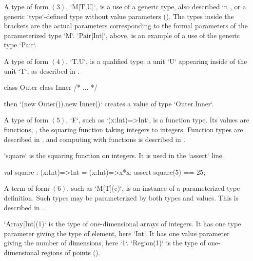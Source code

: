 A type of form {$(3)$}, \xcd`M[T,U]`, is a use of a  generic type, also described in 
, or a generic \xcd`type`-defined type without
value parameters (). 
The types inside the brackets are the actual parameters corresponding to the
formal parameters of the parameterized type \xcd`M`.  
\xcd`Pair[Int]`, above, is an example of a use of the generic type \xcd`Pair`. 

A type of form {$(4)$}, \xcd`T.U`, is a qualified type: a unit \xcd`U` appearing inside of
the unit \xcd`T`, as described in .

\begin{ex}
\begin{xten}
class Outer {
  class Inner { /* ... */ }
}
\end{xten}
%
then 
\xcd`(new Outer()).new Inner()` creates a value of type 
\xcd`Outer.Inner`.

\end{ex}

A type of form {$(5)$}, \xcd`F`, such as \xcd`(x:Int)=>Int`, is a function type.
Its values are functions, \eg, the squaring function taking integers to
integers. Function types are
described in , 
and computing with functions is described in .

\begin{ex}
\xcd`square` is the squaring function on integers.  It is used in the
\xcd`assert` line.
\begin{xten}
val square : (x:Int)=>Int
           = (x:Int)=>x*x;
assert square(5) == 25;
\end{xten}
\end{ex}



A term of form {$(6)$}, such as \xcd`M[T](e)`, is an instance of a
parameterized type definition.  Such types may be parameterized by both types
and values. 
This is described in .

\begin{ex}
\xcd`Array[Int](1)` is the type of one-dimensional arrays of
integers.  It has one type parameter giving the type of element, here
\xcd`Int`.  It has one value parameter giving the number of dimensions, here
\xcd`1`.  
\xcd`Region(1)` is the type of one-dimensional regions of
points ().  
\end{ex}

